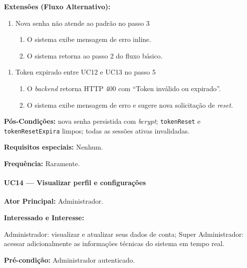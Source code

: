 \textbf{Extensões (Fluxo Alternativo):}

\begin{enumerate}
  \renewcommand{\theenumi}{3a}
  \renewcommand{\labelenumi}{\theenumi.}
  \item Nova senha não atende ao padrão no passo 3
  \begin{enumerate}
  \item O sistema exibe mensagem de erro inline.
  \item O sistema retorna ao passo 2 do fluxo básico.
  \end{enumerate}
\end{enumerate}

\begin{enumerate}
  \renewcommand{\theenumi}{5a}
  \renewcommand{\labelenumi}{\theenumi.}
  \item Token expirado entre UC12 e UC13 no passo 5
  \begin{enumerate}
  \item O \textit{backend} retorna HTTP 400 com
        ``Token inválido ou expirado''.
  \item O sistema exibe mensagem de erro e sugere
        nova solicitação de \textit{reset}.
  \end{enumerate}
\end{enumerate}

\textbf{Pós-Condições:} nova senha persistida com
\textit{bcrypt}; \texttt{tokenReset} e
\texttt{tokenResetExpira} limpos; todas as sessões ativas
invalidadas.

\textbf{Requisitos especiais:} Nenhum.

\textbf{Frequência:} Raramente.

\paragraph{UC14 --- Visualizar perfil e configurações}\hfill\break

\textbf{Ator Principal:} Administrador.

\textbf{Interessado e Interesse:}

Administrador: visualizar e atualizar seus dados de conta;
Super Administrador: acessar adicionalmente as informações
técnicas do sistema em tempo real.

\textbf{Pré-condição:} Administrador autenticado.

